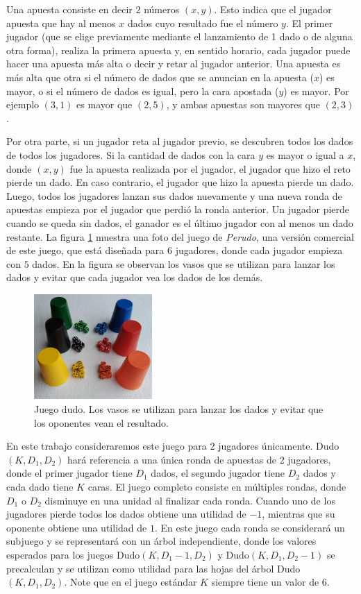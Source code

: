 Una apuesta consiste en decir $2$ números $(x, y)$. Esto indica que el jugador apuesta que hay al menos $x$ dados cuyo resultado fue el número $y$. El primer jugador (que se elige previamente mediante el lanzamiento de 1 dado o de alguna otra forma), realiza la primera apuesta y, en sentido horario, cada jugador puede hacer una apuesta más alta o decir  y retar al jugador anterior. Una apuesta es más alta que otra si el número de dados que se anuncian en la apuesta ($x$) es mayor, o si el número de dados es igual, pero la cara apostada ($y$) es mayor. Por ejemplo $(3, 1)$ es mayor que $(2, 5)$, y ambas apuestas son mayores que $(2, 3)$.

Por otra parte, si un jugador reta al jugador previo, se descubren todos los dados de todos los jugadores. Si la cantidad de dados con la cara $y$ es mayor o igual a $x$, donde $(x, y)$ fue la apuesta realizada por el jugador, el jugador que hizo el reto pierde un dado. En caso contrario, el jugador que hizo la apuesta pierde un dado. Luego, todos los jugadores lanzan sus dados nuevamente y una nueva ronda de apuestas empieza por el jugador que perdió la ronda anterior. Un jugador pierde cuando se queda sin dados, el ganador es el último jugador con al menos un dado restante. La figura \ref{fig:dudo} muestra una foto del juego de \textit{Perudo}, una versión comercial de este juego, que está diseñada para $6$ jugadores, donde cada jugador empieza con $5$ dados. En la figura se observan los vasos que se utilizan para lanzar los dados y evitar que cada jugador vea los dados de los demás.

\begin{figure}[t]
    \centering
    \includegraphics[width=0.4\textwidth]{figuras/dudo.jpg}
    \caption{Juego dudo. Los vasos se utilizan para lanzar los dados y evitar que los oponentes vean el resultado.}
    \label{fig:dudo}
\end{figure}

En este trabajo consideraremos este juego para $2$ jugadores únicamente. Dudo$(K, D_1, D_2)$ hará referencia a una única ronda de apuestas de $2$ jugadores, donde el primer jugador tiene $D_1$ dados, el segundo jugador tiene $D_2$ dados y cada dado tiene $K$ caras. El juego completo consiste en múltiples rondas, donde $D_1$ o $D_2$ disminuye en una unidad al finalizar cada ronda. Cuando uno de los jugadores pierde todos los dados obtiene una utilidad de $-1$, mientras que su oponente obtiene una utilidad de $1$. En este juego cada ronda se considerará un subjuego y se representará con un árbol independiente, donde los valores esperados para los juegos Dudo$(K, D_1 - 1, D_2)$ y Dudo$(K, D_1, D_2 - 1)$ se precalculan y se utilizan como utilidad para las hojas del árbol Dudo$(K, D_1, D_2)$. Note que en el juego estándar $K$ siempre tiene un valor de $6$.

